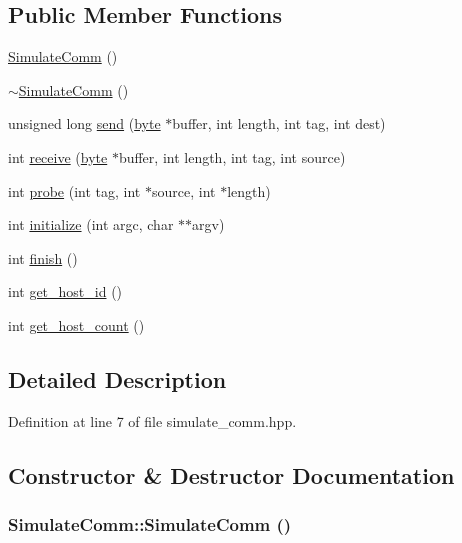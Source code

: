\subsection*{Public Member Functions}
\begin{DoxyCompactItemize}
\item 
\hyperlink{class_simulate_comm_aaa48d4d4fe225bea10b9df8f61754d32}{SimulateComm} ()
\item 
\hyperlink{class_simulate_comm_aa74089e430618f2d94bb47abe644c5d5}{$\sim$SimulateComm} ()
\item 
unsigned long \hyperlink{class_simulate_comm_a5bd343760bc13357ca5e7ef0f1d777e1}{send} (\hyperlink{engine_8hpp_a0c8186d9b9b7880309c27230bbb5e69d}{byte} $\ast$buffer, int length, int tag, int dest)
\item 
int \hyperlink{class_simulate_comm_a1c94227cec96dc0f46791675bd556f0a}{receive} (\hyperlink{engine_8hpp_a0c8186d9b9b7880309c27230bbb5e69d}{byte} $\ast$buffer, int length, int tag, int source)
\item 
int \hyperlink{class_simulate_comm_a3f005f136eac8100b0bf8e7472e55bf3}{probe} (int tag, int $\ast$source, int $\ast$length)
\item 
int \hyperlink{class_simulate_comm_a7086d3778f9c2d01d0425c4d940a57d1}{initialize} (int argc, char $\ast$$\ast$argv)
\item 
int \hyperlink{class_simulate_comm_aab86214be629c432b2fd0922afa6ba6c}{finish} ()
\item 
int \hyperlink{class_simulate_comm_a0cc18f43f08d707c300466e9e1a59184}{get\_\-host\_\-id} ()
\item 
int \hyperlink{class_simulate_comm_abce134f416c691a6910fcf6601ee8829}{get\_\-host\_\-count} ()
\end{DoxyCompactItemize}


\subsection{Detailed Description}


Definition at line 7 of file simulate\_\-comm.hpp.

\subsection{Constructor \& Destructor Documentation}
\hypertarget{class_simulate_comm_aaa48d4d4fe225bea10b9df8f61754d32}{
\subsubsection[{SimulateComm}]{\setlength{\rightskip}{0pt plus 5cm}SimulateComm::SimulateComm ()}}
\label{class_simulate_comm_aaa48d4d4fe225bea10b9df8f61754d32}


